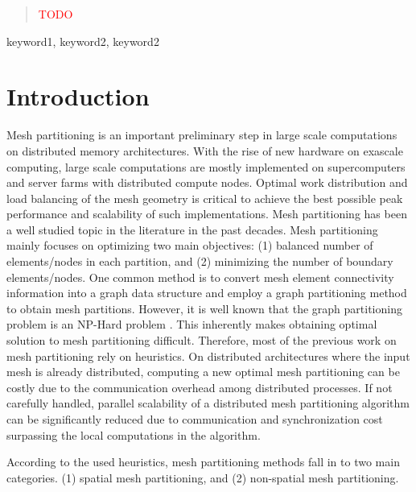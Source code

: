 \documentclass[conference]{IEEEtran}
\begin{document}
\begin{abstract}
    \textcolor{red}{TODO}
\end{abstract}

\begin{IEEEkeywords}
keyword1, keyword2, keyword2
\end{IEEEkeywords}

\section{Introduction}
Mesh partitioning is an important preliminary step in large scale computations on distributed memory architectures. With the rise of new hardware on exascale computing, large scale computations are mostly implemented on supercomputers and server farms with distributed compute nodes. Optimal work distribution and load balancing of the mesh geometry is critical to achieve the best possible peak performance and scalability of such implementations. Mesh partitioning has been a well studied topic in the literature in the past decades. Mesh partitioning mainly focuses on optimizing two main objectives: (1) balanced number of elements/nodes in each partition, and (2) minimizing the number of boundary elements/nodes. One common method is to convert mesh element connectivity information into a graph data structure and employ a graph partitioning method to obtain mesh partitions. However, it is well known that the graph partitioning problem is an NP-Hard problem \cite{npcmpleteness}. This inherently makes obtaining optimal solution to mesh partitioning difficult. Therefore, most of the previous work on mesh partitioning rely on heuristics. On distributed architectures where the input mesh is already distributed, computing a new optimal mesh partitioning can be costly due to the communication overhead among distributed processes. If not carefully handled, parallel scalability of a distributed mesh partitioning algorithm can be significantly reduced due to communication and synchronization cost surpassing the local computations in the algorithm. 
\par
According to the used heuristics, mesh partitioning methods fall in to two main categories. (1) spatial mesh partitioning, and (2) non-spatial mesh partitioning. 
\par
\end{document}
